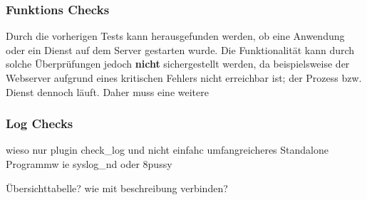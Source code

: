 \subsubsection{Funktions Checks}
Durch die vorherigen Tests kann herausgefunden werden, ob eine Anwendung oder ein Dienst auf dem Server gestarten wurde.
Die Funktionalität kann durch solche Überprüfungen jedoch \textbf{nicht} sichergestellt werden, da beispielsweise der Webserver aufgrund eines kritischen Fehlers nicht erreichbar ist; der Prozess bzw. Dienst dennoch läuft.
Daher muss eine weitere

\subsubsection{Log Checks}
wieso nur plugin check\_log und nicht einfahc umfangreicheres Standalone Programmw ie syslog\_nd oder 8pussy


Übersichttabelle? wie mit beschreibung verbinden?











